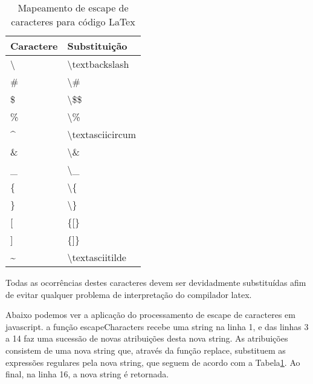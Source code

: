 \begin{table}[H]
    \centering
    \caption{Mapeamento de escape de caracteres para código LaTex}
    \label{tbl:escape-characters}
    \renewcommand{\arraystretch}{1.5}
    \begin{tabular}{p{2.5600000000000005cm} p{3.84cm}}
        \hline
        \textbf{Caractere} & \textbf{Substituição} \\
        \hline
        \textbackslash  & \textbackslash textbackslash  \\
		\# & \textbackslash \# \\
		\$ & \textbackslash \$\$ \\
		\% & \textbackslash \% \\
		\textasciicircum  & \textbackslash textasciicircum  \\
		\& & \textbackslash \& \\
		\_ & \textbackslash \_ \\
		\{ & \textbackslash \{ \\
		\} & \textbackslash \} \\
		{[} & \{{[}\} \\
		{]} & \{{]}\} \\
		\textasciitilde  & \textbackslash textasciitilde  \\
        \hline
        
    \end{tabular}
\end{table}

Todas as ocorrências destes caracteres devem ser devidadmente
substituídas afim de evitar qualquer problema de interpretação do
compilador
\acrshort{latex}.


Abaixo podemos ver a aplicação do processamento de escape de caracteres
em javascript. a função escapeCharacters recebe uma string na linha 1,
e das linhas 3 a 14 faz uma sucessão de novas atribuições desta nova string.
As atribuições consistem de uma nova string que, através da função replace,
substituem as expressões regulares pela nova string, que seguem de acordo
com a
Tabela\ref{tbl:escape-characters}.
Ao final, na linha 16, a nova string é retornada.


